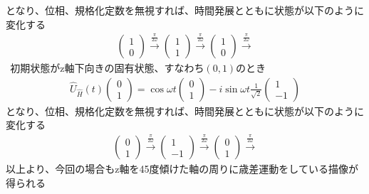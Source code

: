 \documentclass{jsarticle}  %
\numberwithin{equation}{section} %
\numberwithin{figure}{section}
\begin{document}
    となり、位相、規格化定数を無視すれば、時間発展とともに状態が以下のように変化する
    \begin{align}
        \left(
        \begin{matrix}
            1\\
            0
        \end{matrix} 
        \right) \xrightarrow{\frac{\pi}{2\omega}}
        \left(
        \begin{matrix}
            1\\
            1
        \end{matrix} 
        \right) \xrightarrow{\frac{\pi}{2\omega}}
        \left(
        \begin{matrix}
            1\\
            0
        \end{matrix} 
        \right) \xrightarrow{\frac{\pi}{2\omega}}
    \end{align}
    $\ \ $初期状態がz軸下向きの固有状態、すなわち$(0,1)$のとき
    \begin{align}
        \hat{U}_{\hat{H}}(t)
        \left(
        \begin{matrix}
            0\\
            1
        \end{matrix}
        \right) = \cos \omega t
        \left(
        \begin{matrix}
            0\\
            1
        \end{matrix}
        \right) - i\sin \omega t \frac{1}{\sqrt{2}}
        \left(
        \begin{matrix}
            1\\
            -1
        \end{matrix}
        \right)
    \end{align}
    となり、位相、規格化定数を無視すれば、時間発展とともに状態が以下のように変化する
    \begin{align}
        \left(
        \begin{matrix}
            0\\
            1
        \end{matrix} 
        \right) \xrightarrow{\frac{\pi}{2\omega}}
        \left(
        \begin{matrix}
            1\\
            -1
        \end{matrix} 
        \right) \xrightarrow{\frac{\pi}{2\omega}}
        \left(
        \begin{matrix}
            0\\
            1
        \end{matrix} 
        \right) \xrightarrow{\frac{\pi}{2\omega}}
    \end{align}
    以上より、今回の場合もz軸を45度傾けた軸の周りに歳差運動をしている描像が得られる
\end{document}
